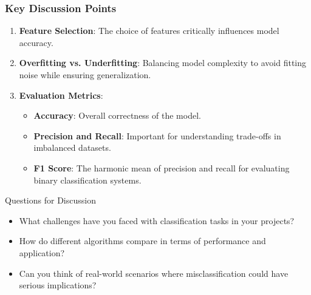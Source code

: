 \documentclass[aspectratio=169]{beamer}
\begin{document}
\begin{frame}[fragile]
  \frametitle{Key Discussion Points}
  \begin{enumerate}
    \item \textbf{Feature Selection}: The choice of features critically influences model accuracy.
    \item \textbf{Overfitting vs. Underfitting}: Balancing model complexity to avoid fitting noise while ensuring generalization.
    \item \textbf{Evaluation Metrics}: 
    \begin{itemize}
      \item \textbf{Accuracy}: Overall correctness of the model.
      \item \textbf{Precision and Recall}: Important for understanding trade-offs in imbalanced datasets.
      \item \textbf{F1 Score}: The harmonic mean of precision and recall for evaluating binary classification systems.
    \end{itemize}
  \end{enumerate}

  \begin{block}{Questions for Discussion}
    \begin{itemize}
      \item What challenges have you faced with classification tasks in your projects?
      \item How do different algorithms compare in terms of performance and application?
      \item Can you think of real-world scenarios where misclassification could have serious implications?
    \end{itemize}
  \end{block}
\end{frame}
\end{document}
